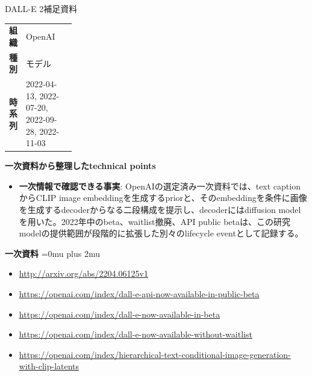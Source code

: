\begin{technicalnote}{DALL-E 2}{補足資料}
\begingroup
\begin{tabularx}{\linewidth}{@{}>{\bfseries}p{0.22\linewidth}X@{}}
組織 & OpenAI \\
種別 & モデル \\
時系列 & 2022-04-13, 2022-07-20, 2022-09-28, 2022-11-03 \\
\end{tabularx}
\smallskip
{\bfseries 一次資料から整理したtechnical points}
\begin{itemize}[leftmargin=1.5em,itemsep=0.35em]
\item \textbf{一次情報で確認できる事実}: OpenAIの選定済み一次資料では、text captionからCLIP image embeddingを生成するpriorと、そのembeddingを条件に画像を生成するdecoderからなる二段構成を提示し、decoderにはdiffusion modelを用いた。2022年中のbeta、waitlist撤廃、API public betaは、この研究modelの提供範囲が段階的に拡張した別々のlifecycle eventとして記録する。
\end{itemize}
\begin{minipage}{\linewidth}
\begin{samepage}
{\bfseries 一次資料}
\begingroup\sloppy
\Urlmuskip=0mu plus 2mu\relax
\begin{itemize}[leftmargin=1.5em,itemsep=0.25em]
\item {\scriptsize\url{http://arxiv.org/abs/2204.06125v1}}
\item {\scriptsize\url{https://openai.com/index/dall-e-api-now-available-in-public-beta}}
\item {\scriptsize\url{https://openai.com/index/dall-e-now-available-in-beta}}
\item {\scriptsize\url{https://openai.com/index/dall-e-now-available-without-waitlist}}
\item {\scriptsize\url{https://openai.com/index/hierarchical-text-conditional-image-generation-with-clip-latents}}
\end{itemize}
\endgroup
\end{samepage}
\end{minipage}
\endgroup
\end{technicalnote}
\medskip

